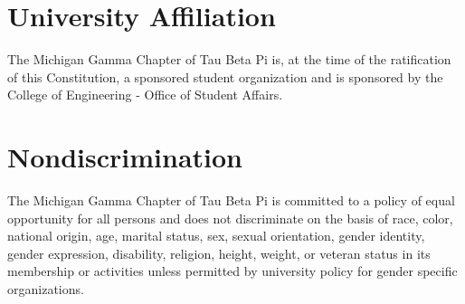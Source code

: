 \section{University Affiliation} The Michigan Gamma Chapter of Tau Beta Pi is, at the time of the ratification of this Constitution, a sponsored student organization and is sponsored by the College of Engineering - Office of Student Affairs. %

\section{Nondiscrimination}  The Michigan Gamma Chapter of Tau Beta Pi is committed to a policy of equal opportunity for all persons and does not discriminate on the basis of race, color, national origin, age, marital status, sex, sexual orientation, gender identity, gender expression, disability, religion, height, weight, or veteran status in its membership or activities unless permitted by university policy for gender specific organizations. 

